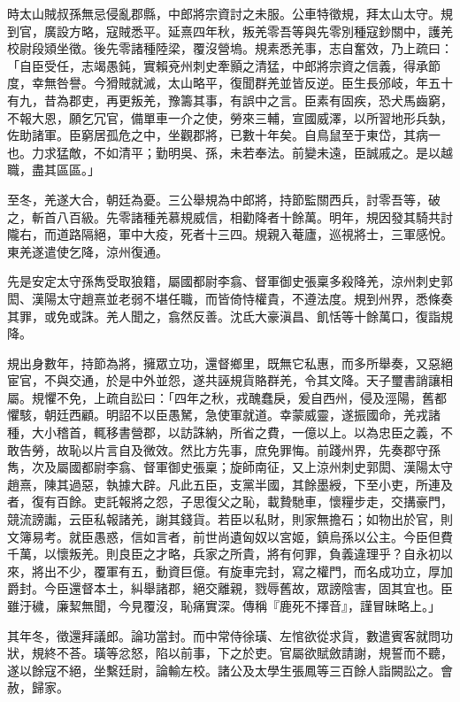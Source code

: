 \begin{pinyinscope}
時太山賊叔孫無忌侵亂郡縣，中郎將宗資討之未服。公車特徵規，拜太山太守。規到官，廣設方略，寇賊悉平。延熹四年秋，叛羌零吾等與先零別種寇鈔關中，護羌校尉段熲坐徵。後先零諸種陸梁，覆沒營塢。規素悉羌事，志自奮效，乃上疏曰：「自臣受任，志竭愚鈍，實賴兗州刺史牽顥之清猛，中郎將宗資之信義，得承節度，幸無咎譽。今猾賊就滅，太山略平，復聞群羌並皆反逆。臣生長邠岐，年五十有九，昔為郡吏，再更叛羌，豫籌其事，有誤中之言。臣素有固疾，恐犬馬齒窮，不報大恩，願乞冗官，備單車一介之使，勞來三輔，宣國威澤，以所習地形兵埶，佐助諸軍。臣窮居孤危之中，坐觀郡將，已數十年矣。自鳥鼠至于東岱，其病一也。力求猛敵，不如清平；勤明吳、孫，未若奉法。前變未遠，臣誠戚之。是以越職，盡其區區。」

至冬，羌遂大合，朝廷為憂。三公舉規為中郎將，持節監關西兵，討零吾等，破之，斬首八百級。先零諸種羌慕規威信，相勸降者十餘萬。明年，規因發其騎共討隴右，而道路隔絕，軍中大疫，死者十三四。規親入菴廬，巡視將士，三軍感悅。東羌遂遣使乞降，涼州復通。

先是安定太守孫雋受取狼籍，屬國都尉李翕、督軍御史張稟多殺降羌，涼州刺史郭閎、漢陽太守趙熹並老弱不堪任職，而皆倚恃權貴，不遵法度。規到州界，悉條奏其罪，或免或誅。羌人聞之，翕然反善。沈氐大豪滇昌、飢恬等十餘萬口，復詣規降。

規出身數年，持節為將，擁眾立功，還督鄉里，既無它私惠，而多所舉奏，又惡絕宦官，不與交通，於是中外並怨，遂共誣規貨賂群羌，令其文降。天子璽書誚讓相屬。規懼不免，上疏自訟曰：「四年之秋，戎醜蠢戾，爰自西州，侵及涇陽，舊都懼駭，朝廷西顧。明詔不以臣愚駑，急使軍就道。幸蒙威靈，遂振國命，羌戎諸種，大小稽首，輒移書營郡，以訪誅納，所省之費，一億以上。以為忠臣之義，不敢告勞，故恥以片言自及微效。然比方先事，庶免罪悔。前踐州界，先奏郡守孫雋，次及屬國都尉李翕、督軍御史張稟；旋師南征，又上涼州刺史郭閎、漢陽太守趙熹，陳其過惡，執據大辟。凡此五臣，支黨半國，其餘墨綬，下至小吏，所連及者，復有百餘。吏託報將之怨，子思復父之恥，載贄馳車，懷糧步走，交搆豪門，競流謗讟，云臣私報諸羌，謝其錢貨。若臣以私財，則家無擔石；如物出於官，則文簿易考。就臣愚惑，信如言者，前世尚遺匈奴以宮姬，鎮烏孫以公主。今臣但費千萬，以懷叛羌。則良臣之才略，兵家之所貴，將有何罪，負義違理乎？自永初以來，將出不少，覆軍有五，動資巨億。有旋車完封，寫之權門，而名成功立，厚加爵封。今臣還督本土，糾舉諸郡，絕交離親，戮辱舊故，眾謗陰害，固其宜也。臣雖汙穢，廉絜無聞，今見覆沒，恥痛實深。傳稱『鹿死不擇音』，謹冒昧略上。」

其年冬，徵還拜議郎。論功當封。而中常侍徐璜、左悺欲從求貨，數遣賓客就問功狀，規終不荅。璜等忿怒，陷以前事，下之於吏。官屬欲賦斂請謝，規誓而不聽，遂以餘寇不絕，坐繫廷尉，論輸左校。諸公及太學生張鳳等三百餘人詣闕訟之。會赦，歸家。


\end{pinyinscope}

